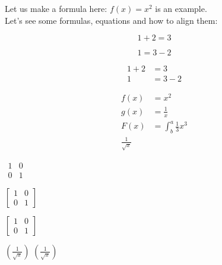 \documentclass{article}
\begin{document}
   Let us make a formula here:
   $f(x) = x^2$ is an example.\\ %
   Let's see some formulas, equations and how to align them:

   \begin{equation*}
      1 + 2 = 3 
   \end{equation*}
    
   \begin{equation*}
      1 = 3 - 2
   \end{equation*}
    
   \begin{align*}
      1 + 2 &= 3\\
      1 &= 3 - 2
   \end{align*}

   \begin{align*}
      f(x) &= x^2\\
      g(x) &= \frac{1}{x}\\
      F(x) &= \int^a_b \frac{1}{3}x^3\\
      \frac{1}{\sqrt{x}}
   \end{align*}
   
   $\begin{matrix}
      1 & 0\\
      0 & 1
   \end{matrix}$

   $[
      \begin{matrix}
         1 & 0\\
         0 & 1
      \end{matrix}
   ]$
   
   $\left[
      \begin{matrix}
         1 & 0\\
         0 & 1
      \end{matrix}
   \right]$

   $(\frac{1}{\sqrt{x}})$
   $\left(\frac{1}{\sqrt{x}}\right)$
\end{document}
